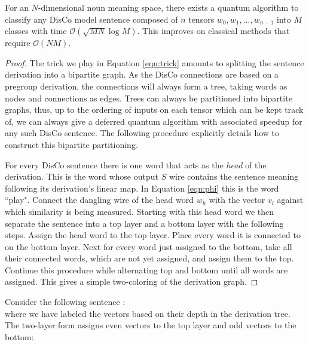 \begin{theorem}
For an $N$-dimensional noun meaning space, there exists a quantum algorithm to classify any DisCo model sentence composed of $n$ tensors $w_0,w_1,...,w_{n-1}$ into $M$ classes with time $\mathcal{O}(\sqrt{MN}\log M)$. This improves on classical methods that require $\mathcal{O}(NM)$.
\end{theorem}
\begin{proof}
The trick we play in Equation \ref{eqn:trick} amounts to splitting the sentence derivation into a bipartite graph.  As the DisCo connections are based on a pregroup derivation, the connections will always form a tree, taking words as nodes and connections as edges. Trees can always be partitioned into bipartite graphs, thus, up to the ordering of inputs on each tensor which can be kept track of, we can always give a deferred quantum algorithm with associated speedup for any such DisCo sentence.
 The following procedure explicitly details how to construct this bipartite partitioning.

For every DisCo sentence there is one word that acts as the \emph{head} of the derivation.  This is the word whose output $S$ wire contains the sentence meaning following its derivation's linear map. In Equation \ref{eqn:phi} this is the word ``play". Connect the dangling wire of the head word $w_h$ with the vector $v_i$ against which similarity is being measured.  Starting with this head word we then separate the sentence into a top layer and a bottom layer with the following steps.  Assign the head word to the top layer. Place every word it is connected to on the bottom layer. Next for every word just assigned to the bottom, take all their connected words, which are not yet assigned, and assign them to the top.  Continue this procedure while alternating top and bottom until all words are assigned. This gives a simple two-coloring of the derivation graph. 
\end{proof}

\begin{example}
Consider the following sentence \cite{dimitriThesis}:
\begin{equation}

\end{equation}
where we have labeled the vectors based on their depth in the derivation tree.  The two-layer form assigns even vectors to the top layer and odd vectors to the bottom:
\begin{equation*}

\end{equation*}
\end{example}

